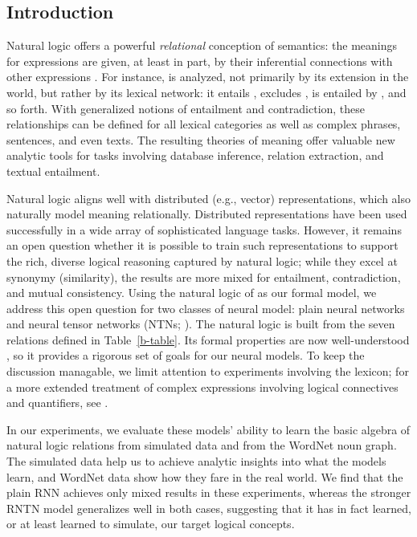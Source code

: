 \subsection*{Introduction}\label{sec:intro}

Natural logic offers a powerful \emph{relational} conception of
semantics: the meanings for expressions are given, at least in part,
by their inferential connections with other expressions
\cite{vanBenthem08NATLOG,maccartney2009extended}. For instance,
 is analyzed, not primarily by its extension in the
world, but rather by its lexical network: it entails ,
excludes , is entailed by , and so forth. With generalized notions of entailment and
contradiction, these relationships can be defined for all lexical
categories as well as complex phrases, sentences, and even texts. The
resulting theories of meaning offer valuable new analytic tools for
tasks involving database inference, relation extraction, and textual
entailment.

Natural logic aligns well with distributed (e.g., vector)
representations, which also naturally model meaning relationally.
Distributed representations have been used successfully in a wide
array of sophisticated language tasks. %
However, it remains an open question whether it is possible to train
such representations to support the rich, diverse logical reasoning
captured by natural logic; while they excel at
synonymy (similarity), the results are more mixed for entailment,
contradiction, and mutual consistency.  Using the natural logic of
\cite{maccartney2009extended} as our formal model, we address this
open question for two classes of neural model: plain neural networks
and neural tensor networks (NTNs; \cite{socher2013acl1}). The natural
logic is built from the seven relations defined in
Table~\ref{b-table}. Its formal properties are now well-understood
\cite{Icard:Moss:2013,Icard:Moss:2013:LILT}, so it provides a rigorous
set of goals for our neural models. To keep the discussion managable,
we limit attention to experiments involving the lexicon; for a more
extended treatment of complex expressions involving logical
connectives and quantifiers, see \citet{Bowman:Potts:Manning:2014}.

In our experiments, we evaluate these models' ability to learn the
basic algebra of natural logic relations from simulated data and from
the WordNet noun graph. The simulated data help us to achieve analytic
insights into what the models learn, and WordNet data show how they
fare in the real world.  We find that the plain RNN achieves only
mixed results in these experiments, whereas the stronger RNTN model
generalizes well in both cases, suggesting that it has in fact
learned, or at least learned to simulate, our target logical concepts.

